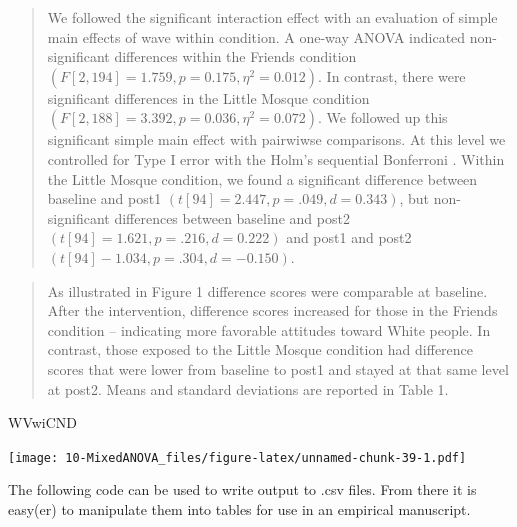 \documentclass[
  11pt,
]{book}
\newenvironment{Shaded}{\begin{snugshade}}{\end{snugshade}}
\newcommand{\AttributeTok}[1]{\textcolor[rgb]{0.27,0.27,0.27}{#1}}
\newcommand{\CommentTok}[1]{\textcolor[rgb]{0.37,0.37,0.37}{\textit{#1}}}
\newcommand{\FunctionTok}[1]{\textcolor[rgb]{0.27,0.27,0.27}{\textbf{#1}}}
\newcommand{\NormalTok}[1]{#1}
\newcommand{\SpecialCharTok}[1]{\textcolor[rgb]{0.43,0.43,0.43}{\textbf{#1}}}
\newcommand{\StringTok}[1]{\textcolor[rgb]{0.5,0.5,0.5}{#1}}
\begin{document}
\begin{quote}
We followed the significant interaction effect with an evaluation of simple main effects of wave within condition. A one-way ANOVA indicated non-significant differences within the Friends condition \((F [2, 194] = 1.759, p = 0.175, \eta^{2} = 0.012)\). In contrast, there were significant differences in the Little Mosque condition \((F[2, 188] = 3.392, p = 0.036, \eta^{2} = 0.072)\). We followed up this significant simple main effect with pairwiwse comparisons. At this level we controlled for Type I error with the Holm's sequential Bonferroni \citep{green_using_2017}. Within the Little Mosque condition, we found a significant difference between baseline and post1 \((t[94] = 2.447, p = .049, d = 0.343)\), but non-significant differences between baseline and post2 \((t[94] = 1.621, p = .216, d = 0.222)\) and post1 and post2 \((t[94] -1.034, p = .304, d = -0.150)\).
\end{quote}

\begin{quote}
As illustrated in Figure 1 difference scores were comparable at baseline. After the intervention, difference scores increased for those in the Friends condition -- indicating more favorable attitudes toward White people. In contrast, those exposed to the Little Mosque condition had difference scores that were lower from baseline to post1 and stayed at that same level at post2. Means and standard deviations are reported in Table 1.
\end{quote}

\begin{Shaded}
\begin{Highlighting}[]
\NormalTok{WVwiCND}
\end{Highlighting}
\end{Shaded}

\texttt{[image: 10-MixedANOVA\_files/figure-latex/unnamed-chunk-39-1.pdf]}

The following code can be used to write output to .csv files. From there it is easy(er) to manipulate them into tables for use in an empirical manuscript.

\begin{Shaded}
\end{Shaded}
\end{document}
